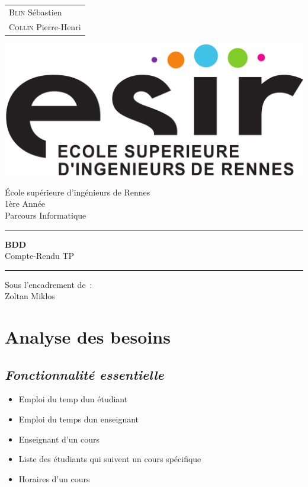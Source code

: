 \documentclass{article}
\begin{document}
\begin{titlepage}
	\vspace{-20px}
	\begin{tabular}{l}
		\textsc{Blin} S\'ebastien\\
		\textsc{Collin} Pierre-Henri
	\end{tabular}
	\hfill \vspace{10px}\includegraphics[scale=0.1]{esir.png}\\
	\vfill
	\begin{center}
		\Huge{\'Ecole sup\'erieure d'ing\'enieurs de Rennes}\\
		\vspace{1cm}
		\LARGE{1\`ere Ann\'ee}\\
		\large{Parcours Informatique}\\
		\vspace{0.5cm}\hrule\vspace{0.5cm}
		\LARGE{\textbf{BDD}}\\
		\Large{Compte-Rendu TP }
		\vspace{0.5cm}\hrule
		\vfill
		\vfill
	\end{center}
	\begin{flushleft}
		\Large{Sous l'encadrement de~:}\\
		\vspace{0.2cm}
		\large{{Zoltan} Miklos}
	\end{flushleft}
	\vfill
\end{titlepage}
\section{Analyse des besoins}
\subsection{\textit{Fonctionnalit\'e essentielle}}
\begin{itemize}
\item Emploi du temp d\textquotesingle un \'etudiant
\item Emploi du temps d\textquotesingle un enseignant
\item Enseignant d'un cours
\item Liste des \'etudiants qui suivent un cours sp\'ecifique
\item Horaires d'un cours
\end{itemize}
\end{document}
